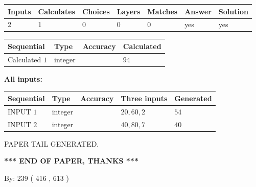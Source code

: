 \documentclass{ctexart}
\begin{document}
   
\noindent\begin{tabular}{|l|l|l|l|l|l|l|}
 \hline
Inputs & Calculates & Choices & Layers & Matches & Answer & Solution \\ \hline
 2  & 
 1  & 
 0
  & 
 0  & 
 0  & 
  yes & 
  yes 
  \\ \hline
 \end{tabular}
   
   
   
   
\noindent{}
   
   
  
  
\noindent\begin{tabular}{|l|l|l|l|}
\hline
 Sequential & Type & Accuracy & Calculated \\ 
\hline
 
 
  Calculated $  1 $ & integer &  & 
  $ 94 $ 
 \\  \hline  
 \end{tabular}
   
   
   
   
\noindent\vspace{0.1in}\hspace{-0.08in} {\textbf{\Large{All inputs: }}}
   
   
  
  
\noindent\begin{tabular}{|l|l|l|l|l|}
\hline
 Sequential & Type & Accuracy & Three inputs & Generated \\ 
\hline
 
 
  INPUT $  1 $ & integer &  & $
 20
 , 
 60
 , 
 2
 $ & $ 54 $ 
 \\  \hline  
 
 
  INPUT $  2 $ & integer &  & $
 40
 , 
 80
 , 
 7
 $ & $ 40 $ 
 \\  \hline  
 \end{tabular}
   
   
   
   
   
   
 \vspace{0.2in}
 
   
   
\vspace{2.0in} PAPER TAIL GENERATED.
   
   
   
   
\vspace{1.0in} 
{\textbf{\large{ *** END OF PAPER, THANKS *** }}} 
   
   
\hspace{1.0in} By: 
 239 ( 416 ,  613 )
   
\end{document}
